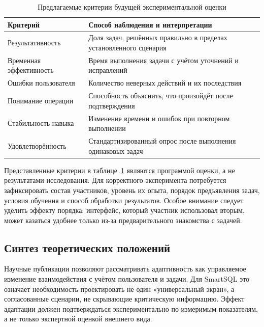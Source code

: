 \begin{table}[htbp]
\caption{Предлагаемые критерии будущей экспериментальной оценки}
\label{tab:metrics}
\small
\begin{tabularx}{\textwidth}{|p{42mm}|X|}
\hline
\textbf{Критерий} & \textbf{Способ наблюдения и интерпретации} \\\hline
Результативность & Доля задач, решённых правильно в пределах установленного сценария \\\hline
Временная эффективность & Время выполнения задачи с учётом уточнений и исправлений \\\hline
Ошибки пользователя & Количество неверных действий и их последствия \\\hline
Понимание операции & Способность объяснить, что произойдёт после подтверждения \\\hline
Стабильность навыка & Изменение времени и ошибок при повторном выполнении \\\hline
Удовлетворённость & Стандартизированный опрос после выполнения одинаковых задач \\\hline
\end{tabularx}
\end{table}

Представленные критерии в таблице~\ref{tab:metrics} являются программой оценки, а не результатами исследования. Для корректного эксперимента потребуется зафиксировать состав участников, уровень их опыта, порядок предъявления задач, условия обучения и способ обработки результатов. Особое внимание следует уделить эффекту порядка: интерфейс, который участник использовал вторым, может казаться удобнее только из-за предварительного знакомства с задачей.

\subsection{Синтез теоретических положений}

Научные публикации позволяют рассматривать адаптивность как управляемое изменение взаимодействия с учётом пользователя и задачи. Для SmartSQL это означает необходимость проектировать не один «универсальный экран», а согласованные сценарии, не скрывающие критическую информацию. Эффект адаптации должен подтверждаться экспериментально по измеримым показателям, а не только экспертной оценкой внешнего вида.